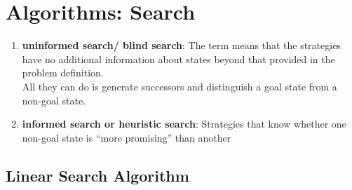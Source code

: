 \chapter{Algorithms: Search}

\begin{enumerate}
    \item \textbf{uninformed search/ blind search}: The term means that the strategies have no additional information about states beyond that provided in the problem definition.\\
    All they can do is generate successors and distinguish a goal state from a non-goal state. 

    \item \textbf{ informed search or heuristic search}: Strategies that know whether one non-goal state is “more promising” than another
\end{enumerate}

\section{Linear Search Algorithm \cite{gfg-linear-search}}\label{Linear Search Algorithm}


